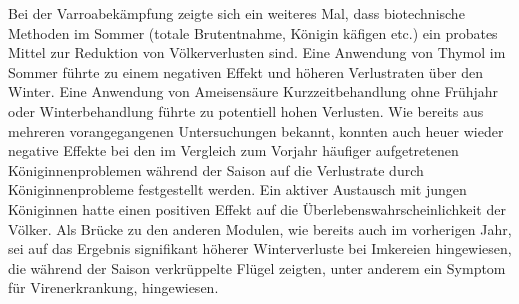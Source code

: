 \newline
Bei der Varroabekämpfung zeigte sich ein weiteres Mal, dass biotechnische Methoden im Sommer (totale Brutentnahme, Königin käfigen etc.) ein probates Mittel zur Reduktion von Völkerverlusten sind. Eine Anwendung von Thymol im Sommer führte zu einem negativen Effekt und höheren Verlustraten über den Winter. Eine Anwendung von Ameisensäure Kurzzeitbehandlung ohne Frühjahr oder Winterbehandlung führte zu potentiell hohen Verlusten.
\newline
Wie bereits aus mehreren vorangegangenen Untersuchungen bekannt, konnten auch heuer wieder negative Effekte bei den im Vergleich zum Vorjahr häufiger aufgetretenen Königinnenproblemen während der Saison auf die Verlustrate durch Königinnenprobleme festgestellt werden. Ein aktiver Austausch mit jungen Königinnen hatte einen positiven Effekt auf die Überlebenswahrscheinlichkeit der Völker.
\newline
Als Brücke zu den anderen Modulen, wie bereits auch im vorherigen Jahr, sei auf das Ergebnis signifikant höherer Winterverluste bei Imkereien hingewiesen, die während der Saison verkrüppelte Flügel zeigten, unter anderem ein Symptom für Virenerkrankung, hingewiesen.

